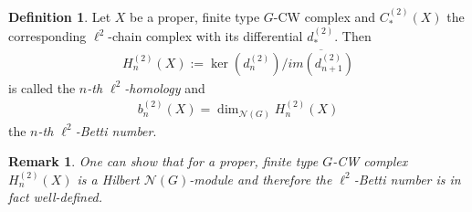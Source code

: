 \documentclass[12pt,a4paper]{scrartcl}
\theoremstyle{plain}
\newtheorem{Remark}[Theorem]{Remark}
\theoremstyle{definition}
\newtheorem{Definition}[Theorem]{Definition}
\numberwithin{equation}{section}
\newcommand{\2}{\mathbb{Z} / 2 \mathbb{Z}}
\newcommand{\1}{\bar{1}}
\newcommand{\0}{\bar{0}}
\begin{document}
\begin{Definition}
	Let $X$ be a proper, finite type $G$-CW complex and $C_*^{(2)}(X)$ the corresponding $\ell^2$-chain complex with its differential $d_*^{(2)}$. Then 
	\begin{align*}
		H_n^{(2)}(X) := \ker(d_n^{(2)}) / \overline{im(d_{n+1}^{(2)})}
	\end{align*}
	is called the \emph{$n$-th $\ell^2$-homology} and 
	\begin{align*}
		b_n^{(2)}(X)=\dim_{\mathcal{N}(G)}H_n^{(2)}(X)
	\end{align*}
	the \emph{$n$-th $\ell^2$-Betti number}.
\end{Definition}
\begin{Remark}
	One can show that for a proper, finite type $G$-CW complex $H_n^{(2)}(X)$ is a Hilbert $\mathcal{N}(G)$-module and therefore the $\ell^2$-Betti number is in fact well-defined.
\end{Remark}
\end{document}
